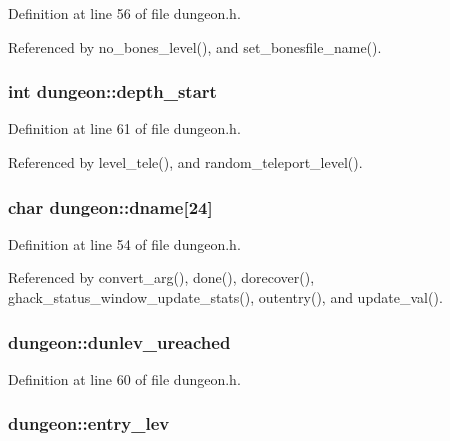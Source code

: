 Definition at line 56 of file dungeon.\+h.



Referenced by no\+\_\+bones\+\_\+level(), and set\+\_\+bonesfile\+\_\+name().

\hypertarget{structdungeon_aad46184797d30fadef5e8428a7717e08}{
\subsubsection[{depth\+\_\+start}]{\setlength{\rightskip}{0pt plus 5cm}int dungeon\+::depth\+\_\+start}}\label{structdungeon_aad46184797d30fadef5e8428a7717e08}


Definition at line 61 of file dungeon.\+h.



Referenced by level\+\_\+tele(), and random\+\_\+teleport\+\_\+level().

\hypertarget{structdungeon_a802ae61c0d552cf15d77175a8d5b7c5c}{
\subsubsection[{dname}]{\setlength{\rightskip}{0pt plus 5cm}char dungeon\+::dname\mbox{[}24\mbox{]}}}\label{structdungeon_a802ae61c0d552cf15d77175a8d5b7c5c}


Definition at line 54 of file dungeon.\+h.



Referenced by convert\+\_\+arg(), done(), dorecover(), ghack\+\_\+status\+\_\+window\+\_\+update\+\_\+stats(), outentry(), and update\+\_\+val().

\hypertarget{structdungeon_ab53e9e80fdf4cfa57d0567a02a02ef76}{
\subsubsection[{dunlev\+\_\+ureached}]{ dungeon\+::dunlev\+\_\+ureached}}\label{structdungeon_ab53e9e80fdf4cfa57d0567a02a02ef76}


Definition at line 60 of file dungeon.\+h.

\hypertarget{structdungeon_aab3e336020052d328e6f9dc4138eb279}{
\subsubsection[{entry\+\_\+lev}]{ dungeon\+::entry\+\_\+lev}}\label{structdungeon_aab3e336020052d328e6f9dc4138eb279}


